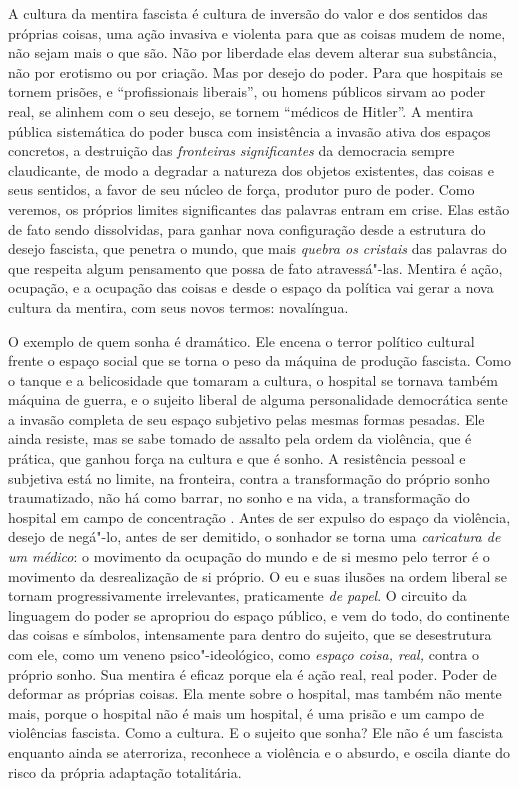 A cultura da mentira fascista é cultura de inversão do valor e dos
sentidos das próprias coisas, uma ação invasiva e violenta para que as
coisas mudem de nome, não sejam mais o que são. Não por liberdade elas
devem alterar sua substância, não por erotismo ou por criação. Mas por
desejo do poder. Para que hospitais se tornem prisões, e ``profissionais
liberais'', ou homens públicos sirvam ao poder real, se alinhem com o
seu desejo, se tornem ``médicos de Hitler''. A mentira pública
sistemática do poder busca com insistência a invasão ativa dos espaços
concretos, a destruição das \emph{fronteiras} \emph{significantes} da
democracia sempre claudicante, de modo a degradar a natureza dos objetos
existentes, das coisas e seus sentidos, a favor de seu núcleo de força,
produtor puro de poder. Como veremos, os próprios limites significantes
das palavras entram em crise. Elas estão de fato sendo dissolvidas, para
ganhar nova configuração desde a estrutura do desejo fascista, que
penetra o mundo, que mais \emph{quebra os cristais} das palavras do que
respeita algum pensamento que possa de fato atravessá"-las. Mentira é
ação, ocupação, e a ocupação das coisas e desde o espaço da política vai
gerar a nova cultura da mentira, com seus novos termos: novalíngua.

O exemplo de quem sonha é dramático. Ele encena o terror político
cultural frente o espaço social que se torna o peso da máquina de
produção fascista. Como o tanque e a belicosidade que tomaram a cultura,
o hospital se tornava também máquina de guerra, e o sujeito liberal de
alguma personalidade democrática sente a invasão completa de seu espaço
subjetivo pelas mesmas formas pesadas. Ele ainda resiste, mas se sabe
tomado de assalto pela ordem da violência, que é prática, que ganhou
força na cultura e que é sonho. A resistência pessoal e subjetiva está
no limite, na fronteira, contra a transformação do próprio sonho
traumatizado, não há como barrar, no sonho e na vida, a transformação do
hospital em campo de concentração . Antes de ser expulso do espaço da
violência, desejo de negá"-lo, antes de ser demitido, o sonhador se torna
uma \emph{caricatura de um médico}: o movimento da ocupação do mundo e
de si mesmo pelo terror é o movimento da desrealização de si próprio. O
eu e suas ilusões na ordem liberal se tornam progressivamente
irrelevantes, praticamente \emph{de papel}. O circuito da linguagem do
poder se apropriou do espaço público, e vem do todo, do continente das
coisas e símbolos, intensamente para dentro do sujeito, que se
desestrutura com ele, como um veneno psico"-ideológico, como \emph{espaço
coisa, real,} contra o próprio sonho. Sua mentira é eficaz porque ela é
ação real, real poder. Poder de deformar as próprias coisas. Ela mente
sobre o hospital, mas também não mente mais, porque o hospital não é
mais um hospital, é uma prisão e um campo de violências fascista. Como a
cultura. E o sujeito que sonha? Ele não é um fascista enquanto ainda se
aterroriza, reconhece a violência e o absurdo, e oscila diante do risco
da própria adaptação totalitária.

